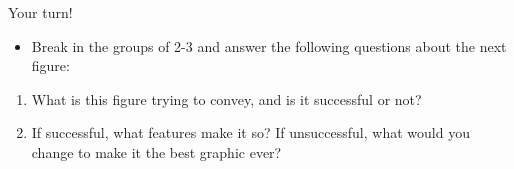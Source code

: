 \documentclass[
  ignorenonframetext,
]{beamer}
\providecommand{\tightlist}{%
  \setlength{\itemsep}{0pt}\setlength{\parskip}{0pt}}
\begin{document}
\begin{frame}{Your turn!}
\protect\hypertarget{your-turn}{}
\begin{itemize}
\tightlist
\item
  Break in the groups of 2-3 and answer the following questions about
  the next figure:
\end{itemize}

\begin{enumerate}
  \item What is this figure trying to convey, and is it successful or not?
  \item If successful, what features make it so?  If unsuccessful, what would you change to make it the best graphic ever?
\end{enumerate}
\end{frame}

\begin{frame}{}
\label{section-29}
\end{frame}
\end{document}
